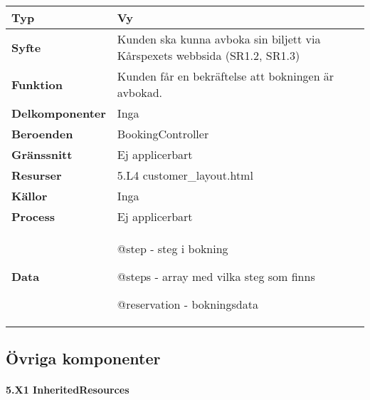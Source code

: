 \documentclass[a4paper, twoside, 11pt, titlepage]{article}
\begin{document}
			\begin {table} [ht] \begin{tabular} {  p{3.5cm} p{11.6cm} }
				\hline
				{\sffamily\textbf{Typ}} & {Vy} \\
				\hline
				{\sffamily\textbf{Syfte}} & {Kunden ska kunna avboka sin biljett via Kårspexets webbsida (SR1.2, SR1.3)} \\
				\hline
				{\sffamily\textbf{Funktion}} & {Kunden får en bekräftelse att bokningen är avbokad.} \\
				\hline
				{\sffamily\textbf{Delkomponenter}} & {Inga} \\
				\hline
				{\sffamily\textbf{Beroenden}} & {BookingController} \\
				\hline
				{\sffamily\textbf{Gränssnitt}} & {Ej applicerbart} \\
				\hline
				{\sffamily\textbf{Resurser}} & {5.L4 customer\_layout.html} \\
				\hline
				{\sffamily\textbf{Källor}} & {Inga} \\
				\hline
				{\sffamily\textbf{Process}} & {Ej applicerbart} \\
				\hline
				{\sffamily\textbf{Data}} & {@step - steg i bokning

@steps - array med vilka steg som finns

@reservation - bokningsdata} \\
				\hline
			\end{tabular} \end{table} \FloatBarrier


	\clearpage %
	\subsection{Övriga komponenter}


			\paragraph{5.X1 InheritedResources}\
\end{document}
